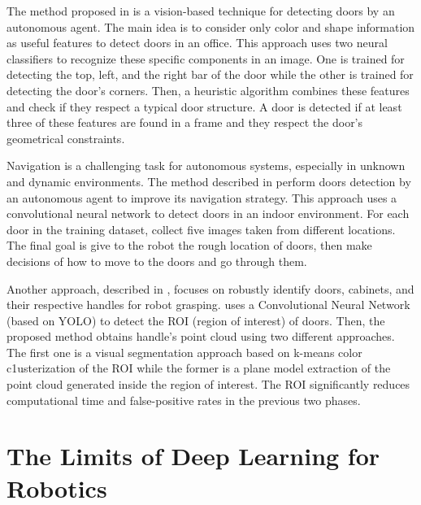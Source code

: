  The method proposed in \cite{detectdoorsfeature} is a vision-based technique for detecting doors by an autonomous agent. The main idea is to consider only color and shape information as useful features to detect doors in an office. This approach uses two neural classifiers to recognize these specific components in an image. One is trained for detecting the top, left, and the right bar of the door while the other is trained for detecting the door's corners. Then, a heuristic algorithm combines these features and check if they respect a typical door structure. A door is detected if at least three of these features are found in a frame and they respect the door's geometrical constraints. 
 
 Navigation is a challenging task for autonomous systems, especially in unknown and dynamic environments. The method described in \cite{doorsandnavigation} perform doors detection by an autonomous agent to improve its navigation strategy. This approach uses a convolutional neural network to detect doors in an indoor environment. For each door in the training dataset, \citeauthor{doorsandnavigation} collect five images taken from different locations. The final goal is give to the robot the rough location of doors, then make decisions of how to move to the doors and go through them.
 
 Another approach, described in \cite{doorcabinet}, focuses on robustly identify doors, cabinets, and their respective handles for robot grasping. \citeauthor{doorcabinet} uses a Convolutional Neural Network (based on YOLO) to detect the ROI (region of interest) of doors. Then, the proposed method obtains handle's point cloud using two different approaches. The first one is a visual segmentation approach based on k-means color c1usterization of the ROI while the former is a plane model extraction of the point cloud generated inside the region of interest. The ROI significantly reduces computational time and false-positive rates in the previous two phases.
 
 \section{The Limits of Deep Learning for Robotics}
 
